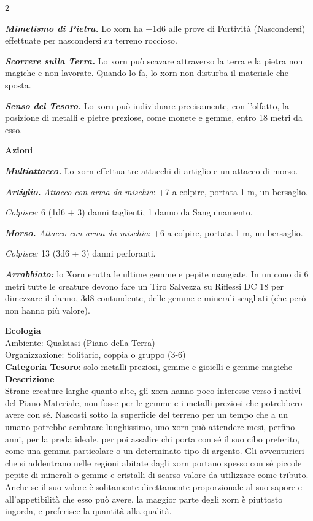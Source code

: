 \begin{multicols}{2}
{\emph{\textbf{Mimetismo di Pietra.}} Lo xorn ha +1d6 alle prove di Furtività (Nascondersi) effettuate per nascondersi su terreno roccioso.

\emph{\textbf{Scorrere sulla Terra.}} Lo xorn può scavare attraverso la terra e la pietra non magiche e non lavorate. Quando lo fa, lo xorn non disturba il materiale che sposta.

\emph{\textbf{Senso del Tesoro.}} Lo xorn può individuare precisamente, con l'olfatto, la posizione di metalli e pietre preziose, come monete e gemme, entro 18 metri da esso.

\textbf{Azioni}

\emph{\textbf{Multiattacco.}} Lo xorn effettua tre attacchi di artiglio e un attacco di morso.

\emph{\textbf{Artiglio.} Attacco con arma da mischia}: +7 a colpire, portata 1 m, un bersaglio.

\emph{Colpisce:} 6 (1d6 + 3) danni taglienti, 1 danno da Sanguinamento.

\emph{\textbf{Morso.} Attacco con arma da mischia}: +6 a colpire, portata 1 m, un bersaglio.

\emph{Colpisce:} 13 (3d6 + 3) danni perforanti.

\emph{\textbf{Arrabbiato:}} lo Xorn erutta le ultime gemme e pepite mangiate. In un cono di 6 metri tutte le creature devono fare un Tiro Salvezza su Riflessi DC 18 per dimezzare il danno, 3d8 contundente, delle gemme e minerali scagliati (che però non hanno più valore).

\textbf{Ecologia}\\
Ambiente: Qualsiasi (Piano della Terra)\\
Organizzazione: Solitario, coppia o gruppo (3-6)\\
\textbf{Categoria Tesoro}: solo metalli preziosi, gemme e gioielli e gemme magiche\\
\textbf{Descrizione}\\
Strane creature larghe quanto alte, gli xorn hanno poco interesse verso i nativi del Piano Materiale, non fosse per le gemme e i metalli preziosi che potrebbero avere con sé. Nascosti sotto la superficie del terreno per un tempo che a un umano potrebbe sembrare lunghissimo, uno xorn può attendere mesi, perfino anni, per la preda ideale, per poi assalire chi porta con sé il suo cibo preferito, come una gemma particolare o un determinato tipo di argento. Gli avventurieri che si addentrano nelle regioni abitate dagli xorn portano spesso con sé piccole pepite di minerali o gemme e cristalli di scarso valore da utilizzare come tributo. Anche se il suo valore è solitamente direttamente proporzionale al suo sapore e all'appetibilità che esso può avere, la maggior parte degli xorn è piuttosto ingorda, e preferisce la quantità alla qualità.

}
\end{multicols}
